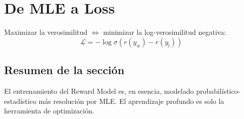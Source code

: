\section{De MLE a Loss}
Maximizar la verosimilitud $\Leftrightarrow$ minimizar la log-verosimilitud negativa:
$$\mathcal{L} = -\log \sigma(r(y_w) - r(y_l))$$

\subsection{Resumen de la sección}
El entrenamiento del Reward Model es, en esencia, modelado probabilístico-estadístico más resolución por MLE. El aprendizaje profundo es solo la herramienta de optimización.

\newpage

